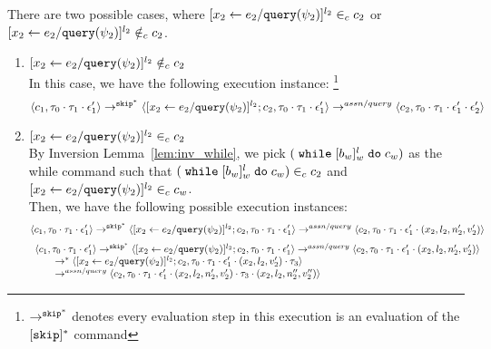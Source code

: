 \begin{subproof}
\begin{subproof}[Subproof]
\label{pf:noiteration_inv2}
There are two possible cases, 
where $[\mathrel{ {x}_2 \leftarrow e_2 / {\tt query}(\psi_2) }]^{l_2} \in_c c_2$ 
or $[\mathrel{ {x}_2 \leftarrow e_2 / {\tt query}(\psi_2) }]^{l_2} \notin_c c_2$.
%
\begin{enumerate}
\item{$[\mathrel{ {x}_2 \leftarrow e_2 / {\tt query}(\psi_2) }]^{l_2}\notin_c c_2$}
\\
In this case, we have the following execution instance:
%
\footnote{$\rightarrow^{\mathtt{skip}^*}$ denotes every evaluation step in this execution is an evaluation of the $[\mathtt{skip}]{}^*$ command}
  \[
  \langle c_1, \mathtt{\tau}_0 \cdot \mathtt{\tau}_1 \cdot \mathtt{\epsilon}_1' \rangle 
  \rightarrow^{\mathtt{skip}^*} 
  \langle [\mathrel{ {x}_2 \leftarrow e_2 / {\tt query}(\psi_2) }]^{l_2} ; {c}_2, \mathtt{\tau}_0 \cdot \mathtt{\tau}_1 \cdot \mathtt{\epsilon}_1' \rangle 
  \rightarrow^{assn/query} 
  \langle {c}_2,  \mathtt{\tau}_0 \cdot \mathtt{\tau}_1 \cdot \mathtt{\epsilon}_1' \cdot \mathtt{\epsilon}_2' \rangle 
 \]
%
\item{$[\mathrel{ {x}_2 \leftarrow e_2 / {\tt query}(\psi_2) }]^{l_2} \in_c c_2$}
\\
By Inversion Lemma~\ref{lem:inv_while}, 
we pick $(\;\mathtt{while}\; [b_w]^l_w \;\mathtt{do}\; c_w)$ 
as the while command such that
$(\;\mathtt{while}\; [b_w]^l_w \;\mathtt{do}\; c_w) \in_c c_2$ and 
$[\mathrel{ {x}_2 \leftarrow e_2 / {\tt query}(\psi_2) }]^{l_2} \in_c c_w$.
\\
Then, we have the following possible execution instances:
  \[
  \langle c_1, \mathtt{\tau}_0 \cdot \mathtt{\tau}_1 \cdot \mathtt{\epsilon}_1' \rangle 
  \rightarrow^{\mathtt{skip}^*} 
  \langle [\mathrel{ {x}_2 \leftarrow e_2 / {\tt query}(\psi_2) }]^{l_2} ; {c}_2, \mathtt{\tau}_0 \cdot \mathtt{\tau}_1 \cdot \mathtt{\epsilon}_1' \rangle 
  \rightarrow^{assn/query} 
  \langle {c}_2,  \mathtt{\tau}_0 \cdot \mathtt{\tau}_1 \cdot \mathtt{\epsilon}_1' \cdot (x_2, l_2, n_2', v_2') \rangle 
 \]
%
  \[
  \begin{array}{l}
  \langle c_1, \mathtt{\tau}_0 \cdot \mathtt{\tau}_1 \cdot \mathtt{\epsilon}_1' \rangle 
  \rightarrow^{\mathtt{skip}^*} 
  \langle [\mathrel{ {x}_2 \leftarrow e_2 / {\tt query}(\psi_2) }]^{l_2} ; {c}_2, \mathtt{\tau}_0 \cdot \mathtt{\tau}_1 \cdot \mathtt{\epsilon}_1' \rangle 
  \rightarrow^{assn/query} 
  \langle {c}_2,  \mathtt{\tau}_0 \cdot \mathtt{\tau}_1 \cdot \mathtt{\epsilon}_1' \cdot (x_2, l_2, n_2', v_2') \rangle 
  \\ \qquad
  \rightarrow^{*} 
  \langle [\mathrel{ {x}_2 \leftarrow e_2 / {\tt query}(\psi_2) }]^{l_2} ; {c}_2, 
  \mathtt{\tau}_0 \cdot \mathtt{\tau}_1 \cdot \mathtt{\epsilon}_1' \cdot (x_2, l_2, v_2') \cdot \mathtt{\tau}_3 \rangle 
  \\ \qquad
  \rightarrow^{assn/query} 
  \langle {c}_2,  \mathtt{\tau}_0 \cdot \mathtt{\tau}_1 \cdot \mathtt{\epsilon}_1' \cdot (x_2, l_2, n_2', v_2') \cdot \mathtt{\tau}_3 \cdot (x_2, l_2, n_2'', v_2'') \rangle 
 \end{array}
\]
\end{enumerate}
\end{subproof}
\end{subproof}
